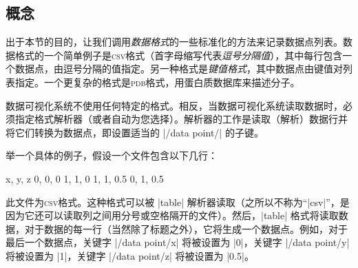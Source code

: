 \subsection{概念}


出于本节的目的，让我们调用\emph{数据格式}的一些标准化的方法来记录数据点列表。数据格式的一个简单例子是\textsc{csv}格式（首字母缩写代表\emph{逗号分隔值}），其中每行包含一个数据点，由逗号分隔的值指定。另一种格式是\emph{键值格式}，其中数据点由键值对列表指定。一个更复杂的格式是\textsc{pdb}格式，用蛋白质数据库来描述分子。


数据可视化系统不使用任何特定的格式。相反，当数据可视化系统读取数据时，必须指定格式解析器（或者自动为您选择）。解析器的工作是读取（解析）数据行并将它们转换为数据点，即设置适当的 |/data point/| 的子键。


举一个具体的例子，假设一个文件包含以下几行：
%
\begin{codeexample}
x, y, z
0, 0, 0
1, 1, 0
1, 1, 0.5
0, 1, 0.5
\end{codeexample}
%
%
此文件为\textsc{csv}格式。这种格式可以被 |table| 解析器读取（之所以不称为``|csv|''，是因为它还可以读取列之间用分号或空格隔开的文件）。然后，|table| 格式将读取数据，对于数据的每一行（当然除了标题之外），它将生成一个数据点。例如，对于最后一个数据点，关键字 |/data point/x| 将被设置为 |0|，关键字 |/data point/y| 将被设置为 |1|，关键字 |/data point/z| 将被设置为 |0.5|。

